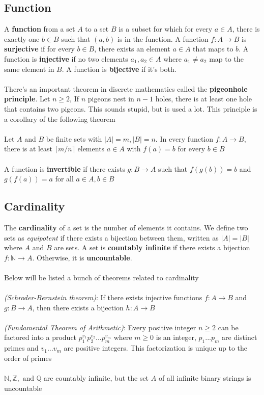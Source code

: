 \documentclass{article}
\begin{document}
\subsection{Function}
A \textbf{function} from a set $A$ to a set $B$ is a subset for which for every $a \in A$, there is exactly one $b \in B$ such that $(a,b)$ is in the function. A function $f: A\rightarrow B$ is \textbf{surjective} if for every $b \in B$, there exists an element $a \in A$ that maps to $b$. A function is \textbf{injective} if no two elements $a_1,a_2\in A$ where $a_1 \ne a_2$ map to the same element in $B$. A function is \textbf{bijective} if it's both.
\\\\
There's an important theorem in discrete mathematics called the \textbf{pigeonhole principle}. Let $n \ge 2$, If $n$ pigeons nest in $n-1$ holes, there is at least one hole that contains two pigeons. This sounds stupid, but is used a lot. This principle is a corollary of the following theorem
\\\\
Let $A$ and $B$ be finite sets with $|A| = m, |B| = n$. In every function $f:A\rightarrow B$, there is at least $\lceil m/n\rceil$ elements $a \in A$ with $f(a) = b$ for every $b\in B$
\\\\
A function is \textbf{invertible} if there exists $g:B\rightarrow A$ such that $f(g(b)) = b$ and $g(f(a)) = a$ for all $a\in A, b\in B$

\subsection{Cardinality}
The \textbf{cardinality} of a set is the number of elements it contains. We define two sets as \textit{equipotent} if there exists a bijection between them, written as $|A| = |B|$ where $A$ and $B$ are sets. A set is \textbf{countably infinite} if there exists a bijection $f: \mathds{N} \rightarrow A$. Otherwise, it is \textbf{uncountable}.
\\\\
Below will be listed a bunch of theorems related to cardinality
\\\\
\textit{(Schroder-Bernstein theorem)}: If there exists injective functions $f:A\rightarrow B$ and  $g: B \rightarrow A$, then there exists a bijection $h: A\rightarrow B$
\\\\
\textit{(Fundamental Theorem of Arithmetic)}: Every positive integer $n\ge 2$ can be factored into a product $p_1^{v_1}p_2^{v_2}...p_m^{v_m}$ where $m \ge 0$ is an integer, $p_1...p_m$ are distinct primes and $v_1...v_m$ are positive integers. This factorization is unique up to the order of primes
\\\\
$\mathds{N},\mathds{Z}, \text{ and } \mathds{Q}$ are countably infinite, but the set $A$ of all infinite binary strings is uncountable
\end{document}
